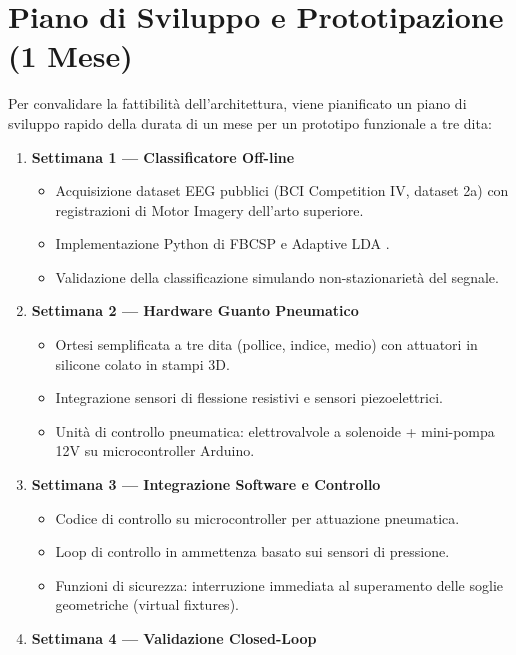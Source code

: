 \documentclass[a4paper,11pt]{article}
\begin{document}
\section{Piano di Sviluppo e Prototipazione (1 Mese)}
Per convalidare la fattibilità dell'architettura, viene pianificato un piano
di sviluppo rapido della durata di un mese per un prototipo funzionale a tre dita:

\begin{enumerate}
    \item \textbf{Settimana 1 — Classificatore Off-line}
    \begin{itemize}
        \item Acquisizione dataset EEG pubblici (BCI Competition IV, dataset 2a)
        con registrazioni di Motor Imagery dell'arto superiore.
        \item Implementazione Python di FBCSP e Adaptive LDA \cite{wu2024adaptive}.
        \item Validazione della classificazione simulando non-stazionarietà del segnale.
    \end{itemize}
    \item \textbf{Settimana 2 — Hardware Guanto Pneumatico}
    \begin{itemize}
        \item Ortesi semplificata a tre dita (pollice, indice, medio) con attuatori
        in silicone colato in stampi 3D.
        \item Integrazione sensori di flessione resistivi e sensori piezoelettrici.
        \item Unità di controllo pneumatica: elettrovalvole a solenoide + mini-pompa
        12V su microcontroller Arduino.
    \end{itemize}
    \item \textbf{Settimana 3 — Integrazione Software e Controllo}
    \begin{itemize}
        \item Codice di controllo su microcontroller per attuazione pneumatica.
        \item Loop di controllo in ammettenza basato sui sensori di pressione.
        \item Funzioni di sicurezza: interruzione immediata al superamento delle soglie
        geometriche (virtual fixtures).
    \end{itemize}
    \item \textbf{Settimana 4 — Validazione Closed-Loop}

\end{enumerate}
\end{document}
